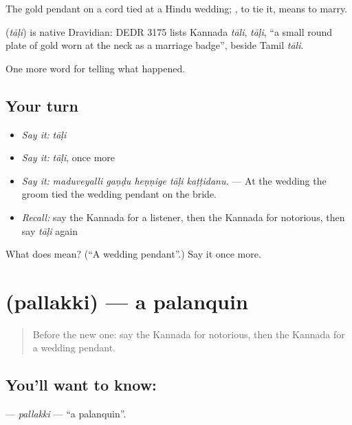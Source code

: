 The gold pendant on a cord tied at a Hindu wedding;  , to tie it, means to marry.

\begin{cousinweb}
\textbf{} (\emph{tāḷi}) is native Dravidian: DEDR 3175 lists Kannada \emph{tāli}, \emph{tāḷi}, \textquotedblleft{}a small round plate of gold worn at the neck as a marriage badge\textquotedblright{}, beside Tamil \emph{tāli}.
\end{cousinweb}

\begin{grammarlens}[title={What you've built}]
One more word for telling what happened.
\end{grammarlens}

\subsection*{Your turn}
\begin{itemize}
\raggedright
  \item \emph{Say it:} \emph{tāḷi}
  \item \emph{Say it:} \emph{tāḷi}, once more
  \item \emph{Say it:} \emph{maduveyalli gaṇḍu heṇṇige tāḷi kaṭṭidanu.} — At the wedding the groom tied the wedding pendant on the bride.
  \item \emph{Recall:} say the Kannada for a listener, then the Kannada for notorious, then say \emph{tāḷi} again
\end{itemize}

\begin{tcolorbox}[breakable,colback=teal!4,colframe=teal!35!black,title={Before you move on}]
What does  mean? (\textquotedblleft{}A wedding pendant\textquotedblright{}.) Say it once more.
\end{tcolorbox}
\section[\texorpdfstring{\kn{ಪಲ್ಲಕ್ಕಿ} (pallakki)}{ಪಲ್ಲಕ್ಕಿ (pallakki)}]{ (pallakki) — a palanquin}

\label{lesson:KA-C371-pallakki}



\begin{quote}
Before the new one: say the Kannada for notorious, then the Kannada for a wedding pendant.
\end{quote}

\subsection*{You'll want to know: }
\textbf{} — \emph{pallakki} — \textquotedblleft{}a palanquin\textquotedblright{}.

